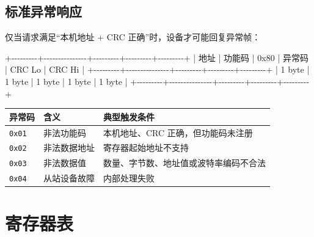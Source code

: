 \documentclass[
  chinese,
]{ctexart}
\newenvironment{Shaded}{}{}
\newcommand{\NormalTok}[1]{#1}
\newcounter{none} %
\begin{document}
\subsection{标准异常响应}\label{ux6807ux51c6ux5f02ux5e38ux54cdux5e94}

仅当请求满足``本机地址 + CRC 正确''时，设备才可能回复异常帧：

\begin{Shaded}
\begin{Highlighting}[]
\NormalTok{+{-}{-}{-}{-}{-}{-}{-}{-}{-}+{-}{-}{-}{-}{-}{-}{-}{-}{-}{-}{-}{-}{-}{-}{-}+{-}{-}{-}{-}{-}{-}{-}{-}{-}+{-}{-}{-}{-}{-}{-}{-}{-}{-}+{-}{-}{-}{-}{-}{-}{-}{-}{-}+}
\NormalTok{| 地址    | 功能码 | 0x80 | 异常码  | CRC Lo  | CRC Hi  |}
\NormalTok{+{-}{-}{-}{-}{-}{-}{-}{-}{-}+{-}{-}{-}{-}{-}{-}{-}{-}{-}{-}{-}{-}{-}{-}{-}+{-}{-}{-}{-}{-}{-}{-}{-}{-}+{-}{-}{-}{-}{-}{-}{-}{-}{-}+{-}{-}{-}{-}{-}{-}{-}{-}{-}+}
\NormalTok{| 1 byte  | 1 byte         | 1 byte  | 1 byte  | 1 byte  |}
\NormalTok{+{-}{-}{-}{-}{-}{-}{-}{-}{-}+{-}{-}{-}{-}{-}{-}{-}{-}{-}{-}{-}{-}{-}{-}{-}+{-}{-}{-}{-}{-}{-}{-}{-}{-}+{-}{-}{-}{-}{-}{-}{-}{-}{-}+{-}{-}{-}{-}{-}{-}{-}{-}{-}+}
\end{Highlighting}
\end{Shaded}

{\def\LTcaptype{none} %
\begin{longtable}[]{@{}lll@{}}
\toprule\noalign{}
异常码 & 含义 & 典型触发条件 \\
\midrule\noalign{}
\endhead
\bottomrule\noalign{}
\endlastfoot
\texttt{0x01} & 非法功能码 & 本机地址、CRC 正确，但功能码未注册 \\
\texttt{0x02} & 非法数据地址 & 寄存器起始地址不支持 \\
\texttt{0x03} & 非法数据值 & 数量、字节数、地址值或波特率编码不合法 \\
\texttt{0x04} & 从站设备故障 & 内部处理失败 \\
\end{longtable}
}

\section{寄存器表}\label{ux5bc4ux5b58ux5668ux8868}
\end{document}
